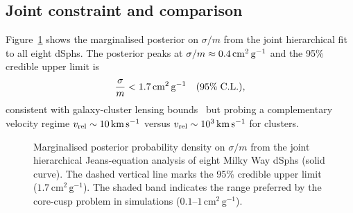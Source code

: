 \subsection{Joint constraint and comparison}

Figure~\ref{fig:posterior} shows the marginalised posterior on $\sigma/m$ from
the joint hierarchical fit to all eight dSphs.
The posterior peaks at $\sigma/m \approx 0.4\,\mathrm{cm^{2}\,g^{-1}}$ and the 95\% credible upper
limit is
\begin{equation}
  \frac{\sigma}{m} < 1.7\,\mathrm{cm^{2}\,g^{-1}} \quad (95\%\;\text{C.L.}),
  \label{eq:result}
\end{equation}
consistent with galaxy-cluster lensing bounds~\cite{Kaplinghat2016} but
probing a complementary velocity regime $v_{\rm rel}\sim 10\,\mathrm{km\,s^{-1}}$ versus
$v_{\rm rel}\sim 10^{3}\,\mathrm{km\,s^{-1}}$ for clusters.

\begin{figure}[t]
  \caption{%
    Marginalised posterior probability density on $\sigma/m$ from the joint
    hierarchical Jeans-equation analysis of eight Milky Way dSphs (solid curve).
    The dashed vertical line marks the 95\% credible upper limit
    ($1.7\,\mathrm{cm^{2}\,g^{-1}}$).
    The shaded band indicates the range preferred by the core-cusp problem in
    simulations ($0.1$--$1\,\mathrm{cm^{2}\,g^{-1}}$).
  }
  \label{fig:posterior}
\end{figure}

